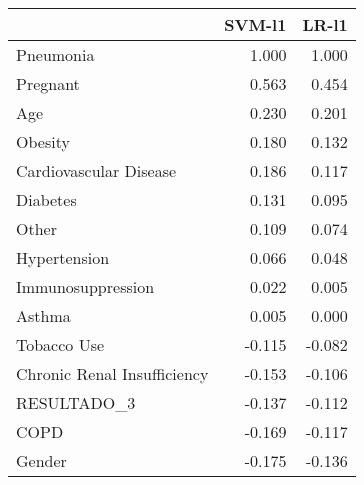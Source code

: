 \begin{tabular}{lrr}
\toprule
{} &  SVM-l1 &  LR-l1 \\
\midrule
Pneumonia                   &   1.000 &  1.000 \\
Pregnant                    &   0.563 &  0.454 \\
Age                         &   0.230 &  0.201 \\
Obesity                     &   0.180 &  0.132 \\
Cardiovascular Disease      &   0.186 &  0.117 \\
Diabetes                    &   0.131 &  0.095 \\
Other                       &   0.109 &  0.074 \\
Hypertension                &   0.066 &  0.048 \\
Immunosuppression           &   0.022 &  0.005 \\
Asthma                      &   0.005 &  0.000 \\
Tobacco Use                 &  -0.115 & -0.082 \\
Chronic Renal Insufficiency &  -0.153 & -0.106 \\
RESULTADO\_3                 &  -0.137 & -0.112 \\
COPD                        &  -0.169 & -0.117 \\
Gender                      &  -0.175 & -0.136 \\
\bottomrule
\end{tabular}
